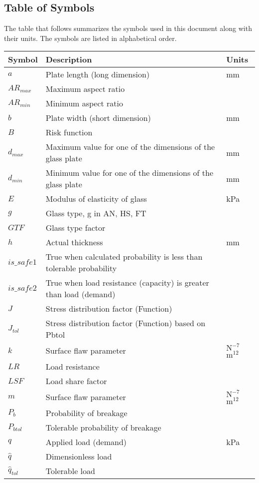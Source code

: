 \documentclass[12pt]{article}
\begin{document}
\subsection{Table of Symbols}
\label{Sec:TablofSymb}
The table that follows summarizes the symbols used in this document along with their units. The symbols are listed in alphabetical order.
\begin{longtable*}{l l l}
\toprule
Symbol & Description & Units
\\
\midrule
$a$ & Plate length (long dimension) & mm
\\
$AR_{max}$ & Maximum aspect ratio & 
\\
$AR_{min}$ & Minimum aspect ratio & 
\\
$b$ & Plate width (short dimension) & mm
\\
$B$ & Risk function & 
\\
$d_{max}$ & Maximum value for one of the dimensions of the glass plate & mm
\\
$d_{min}$ & Minimum value for one of the dimensions of the glass plate & mm
\\
$E$ & Modulus of elasticity of glass & kPa
\\
$g$ & Glass type, g in {AN, HS, FT} & 
\\
$GTF$ & Glass type factor & 
\\
$h$ & Actual thickness & mm
\\
$is\_safe1$ & True when calculated probability is less than tolerable probability & 
\\
$is\_safe2$ & True when load resistance (capacity) is greater than load (demand) & 
\\
$J$ & Stress distribution factor (Function) & 
\\
$J_{tol}$ & Stress distribution factor (Function) based on Pbtol & 
\\
$k$ & Surface flaw parameter & $\text{N}^{-7}$$\text{m}^{12}$
\\
$LR$ & Load resistance & 
\\
$LSF$ & Load share factor & 
\\
$m$ & Surface flaw parameter & $\text{N}^{-7}$$\text{m}^{12}$
\\
$P_{b}$ & Probability of breakage & 
\\
$P_{btol}$ & Tolerable probability of breakage & 
\\
$q$ & Applied load (demand) & kPa
\\
$\hat{q}$ & Dimensionless load & 
\\
$\hat{q}_{tol}$ & Tolerable load & 

\end{longtable*}
\end{document}
